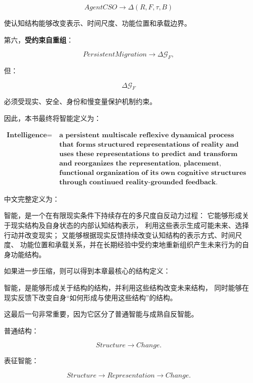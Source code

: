 \[
AgentCSO
\rightarrow
\Delta(R,F,\tau,B)
\]

使认知结构能够改变表示、时间尺度、功能位置和承载边界。

第六，\textbf{受约束自重组}：

\[
PersistentMigration
\rightarrow
\Delta\mathcal G_F,
\]

但：

\[
\Delta\mathcal G_F
\]

必须受现实、安全、身份和慢变量保护机制约束。

因此，本书最终将智能定义为：

\[
\boxed{
\begin{aligned}
\textbf{Intelligence}
=
&\ \textbf{a persistent multiscale reflexive dynamical process}\\
&\ \textbf{that forms structured representations of reality and itself,}\\
&\ \textbf{uses these representations to predict and transform future reality,}\\
&\ \textbf{and reorganizes the representation, placement, timescale and}\\
&\ \textbf{functional organization of its own cognitive structures}\\
&\ \textbf{through continued reality-grounded feedback.}
\end{aligned}
}
\]

中文完整定义为：

\begin{definition*}
智能，是一个在有限现实条件下持续存在的多尺度自反动力过程：
它能够形成关于现实结构及自身状态的内部认知结构表示，
利用这些表示生成可能未来、选择行动并改变现实；
又能够根据现实反馈持续改变认知结构的表示方式、时间尺度、
功能位置和承载关系，并在长期经验中受约束地重新组织产生未来行为的自身功能结构。
\end{definition*}

如果进一步压缩，则可以得到本章最核心的结构定义：

\begin{definition*}
智能，是能够形成关于结构的结构，并利用这些结构改变未来结构，
同时能够在现实反馈下改变自身“如何形成与使用这些结构”的结构。
\end{definition*}

这最后一句非常重要，因为它区分了普通智能与成熟自反智能。

普通结构：

\[
Structure
\rightarrow
Change.
\]

表征智能：

\[
Structure
\rightarrow
Representation
\rightarrow
Change.
\]

